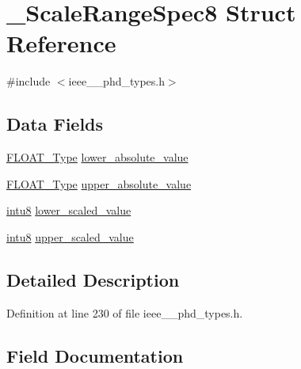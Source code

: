 \hypertarget{struct___scale_range_spec8}{}\section{\+\_\+\+Scale\+Range\+Spec8 Struct Reference}
\label{struct___scale_range_spec8}


{\ttfamily \#include $<$ieee\+\_\+\_\+phd\+\_\+types.\+h$>$}

\subsection*{Data Fields}
\begin{DoxyCompactItemize}
\item 
\hyperlink{ieee__11073__phd__types_8h_af070130e724f8e6babaa500f89591392}{F\+L\+O\+A\+T\+\_\+\+Type} \hyperlink{struct___scale_range_spec8_a76e8282bddb1102f4d0eba8c6495c0dd}{lower\+\_\+absolute\+\_\+value}
\item 
\hyperlink{ieee__11073__phd__types_8h_af070130e724f8e6babaa500f89591392}{F\+L\+O\+A\+T\+\_\+\+Type} \hyperlink{struct___scale_range_spec8_a277c28db15b66bc84d310a9d82c73ad1}{upper\+\_\+absolute\+\_\+value}
\item 
\hyperlink{ieee__11073__phd__types_8h_ae21d5428a584a153613cbe335630d3f4}{intu8} \hyperlink{struct___scale_range_spec8_a663be6169871a00765b7f6d06dfb37f3}{lower\+\_\+scaled\+\_\+value}
\item 
\hyperlink{ieee__11073__phd__types_8h_ae21d5428a584a153613cbe335630d3f4}{intu8} \hyperlink{struct___scale_range_spec8_ad8db8e3ab1af7560fb86138306603888}{upper\+\_\+scaled\+\_\+value}
\end{DoxyCompactItemize}


\subsection{Detailed Description}


Definition at line 230 of file ieee\+\_\+\_\+phd\+\_\+types.\+h.



\subsection{Field Documentation}
\hypertarget{struct___scale_range_spec8_a76e8282bddb1102f4d0eba8c6495c0dd}{}

